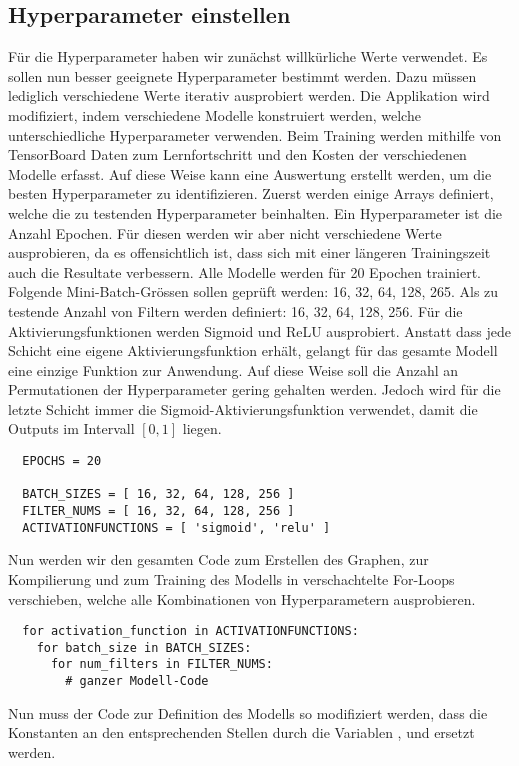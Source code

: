 \subsection{Hyperparameter einstellen}
Für die Hyperparameter haben wir zunächst willkürliche Werte verwendet. Es
sollen nun besser geeignete Hyperparameter bestimmt werden. Dazu müssen
lediglich verschiedene Werte iterativ ausprobiert werden.
Die Applikation wird modifiziert, indem verschiedene Modelle konstruiert werden,
welche unterschiedliche Hyperparameter verwenden.
Beim Training werden mithilfe von TensorBoard
Daten zum Lernfortschritt und den Kosten der verschiedenen Modelle erfasst. Auf
diese Weise kann eine Auswertung erstellt werden, um die besten Hyperparameter
zu identifizieren.
\para{}
Zuerst werden einige Arrays definiert, welche die zu testenden Hyperparameter beinhalten.
Ein Hyperparameter ist die Anzahl Epochen. Für diesen werden wir aber nicht
verschiedene Werte ausprobieren, da es offensichtlich ist, dass sich mit einer längeren Trainingszeit auch die
Resultate verbessern.
Alle Modelle werden für 20 Epochen trainiert.
\para{}
Folgende Mini-Batch-Grössen sollen geprüft werden: 16, 32, 64, 128, 265.
Als zu testende Anzahl von Filtern werden definiert: 16, 32, 64, 128, 256.
Für die Aktivierungsfunktionen werden Sigmoid und ReLU ausprobiert. Anstatt dass
jede Schicht eine eigene Aktivierungsfunktion erhält, gelangt für das gesamte
Modell eine einzige Funktion zur Anwendung. Auf diese Weise soll die Anzahl an
Permutationen der Hyperparameter gering gehalten werden.
Jedoch wird für die letzte Schicht immer die
Sigmoid-Aktivierungsfunktion verwendet, damit die Outputs im Intervall $[0,1]$
liegen.

\begin{verbatim}
  EPOCHS = 20

  BATCH_SIZES = [ 16, 32, 64, 128, 256 ]
  FILTER_NUMS = [ 16, 32, 64, 128, 256 ]
  ACTIVATIONFUNCTIONS = [ 'sigmoid', 'relu' ]
\end{verbatim}
Nun werden wir den gesamten Code zum Erstellen des Graphen, zur Kompilierung und
zum Training des Modells in verschachtelte For-Loops verschieben, welche alle
Kombinationen von Hyperparametern ausprobieren.

\begin{verbatim}
  for activation_function in ACTIVATIONFUNCTIONS:
    for batch_size in BATCH_SIZES:
      for num_filters in FILTER_NUMS:
        # ganzer Modell-Code
\end{verbatim}
Nun muss der Code zur Definition des Modells so modifiziert werden, dass die
Konstanten an den entsprechenden Stellen durch die Variablen
,  und  ersetzt
werden.

